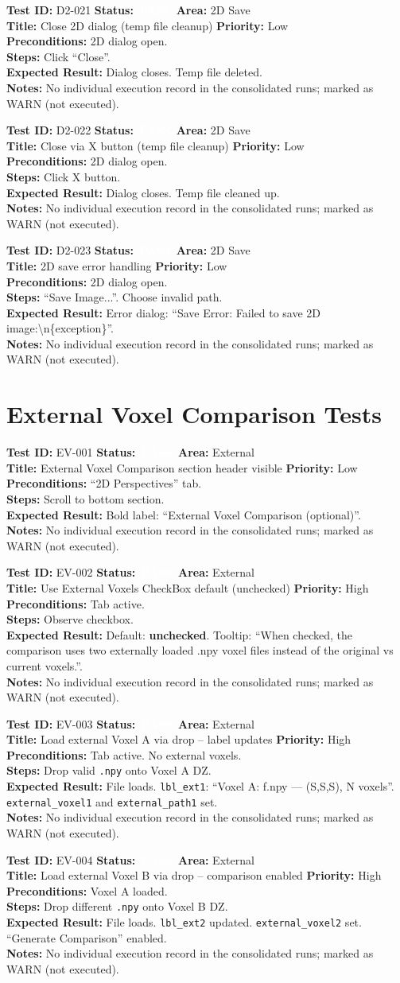 \documentclass[12pt,a4paper]{article}
\newcommand{\statuspass}{\colorbox{statusgreen}{\textcolor{white}{\textbf{\,PASS\,}}}}
\newcommand{\testcase}[9]{%
  \smallskip
  \noindent\textbf{Test ID:} #1 \hfill \textbf{Status:} #2 \hfill \textbf{Area:} #3 \\
  \textbf{Title:} #4 \hfill \textbf{Priority:} #5 \\[0.3em]
  \textbf{Preconditions:} #6 \\[0.3em]
  \textbf{Steps:} #7 \\[0.3em]
  \textbf{Expected Result:} #8 \\
  \textbf{Notes:} #9
  \smallskip
}
\begin{document}
\testcase{D2-021}{\statuspass}{2D Save}{Close 2D dialog (temp file cleanup)}{Low}{2D dialog open.}{Click ``Close''.}{Dialog closes. Temp file deleted.}{No individual execution record in the consolidated runs; marked as WARN (not executed).}


\testcase{D2-022}{\statuspass}{2D Save}{Close via X button (temp file cleanup)}{Low}{2D dialog open.}{Click X button.}{Dialog closes. Temp file cleaned up.}{No individual execution record in the consolidated runs; marked as WARN (not executed).}


\testcase{D2-023}{\statuspass}{2D Save}{2D save error handling}{Low}{2D dialog open.}{``Save Image...''. Choose invalid path.}{Error dialog: ``Save Error: Failed to save 2D image:\textbackslash n\{exception\}''.}{No individual execution record in the consolidated runs; marked as WARN (not executed).}



\section{External Voxel Comparison Tests}

\testcase{EV-001}{\statuspass}{External}{External Voxel Comparison section header visible}{Low}{``2D Perspectives'' tab.}{Scroll to bottom section.}{Bold label: ``External Voxel Comparison (optional)''.}{No individual execution record in the consolidated runs; marked as WARN (not executed).}


\testcase{EV-002}{\statuspass}{External}{Use External Voxels CheckBox default (unchecked)}{High}{Tab active.}{Observe checkbox.}{Default: \textbf{unchecked}. Tooltip: ``When checked, the comparison uses two externally loaded .npy voxel files instead of the original vs current voxels.''.}{No individual execution record in the consolidated runs; marked as WARN (not executed).}


\testcase{EV-003}{\statuspass}{External}{Load external Voxel A via drop -- label updates}{High}{Tab active. No external voxels.}{Drop valid \texttt{.npy} onto Voxel A DZ.}{File loads. \texttt{lbl\_ext1}: ``Voxel A: f.npy --- (S,S,S), N voxels''. \texttt{external\_voxel1} and \texttt{external\_path1} set.}{No individual execution record in the consolidated runs; marked as WARN (not executed).}


\testcase{EV-004}{\statuspass}{External}{Load external Voxel B via drop -- comparison enabled}{High}{Voxel A loaded.}{Drop different \texttt{.npy} onto Voxel B DZ.}{File loads. \texttt{lbl\_ext2} updated. \texttt{external\_voxel2} set. ``Generate Comparison'' enabled.}{No individual execution record in the consolidated runs; marked as WARN (not executed).}
\end{document}
